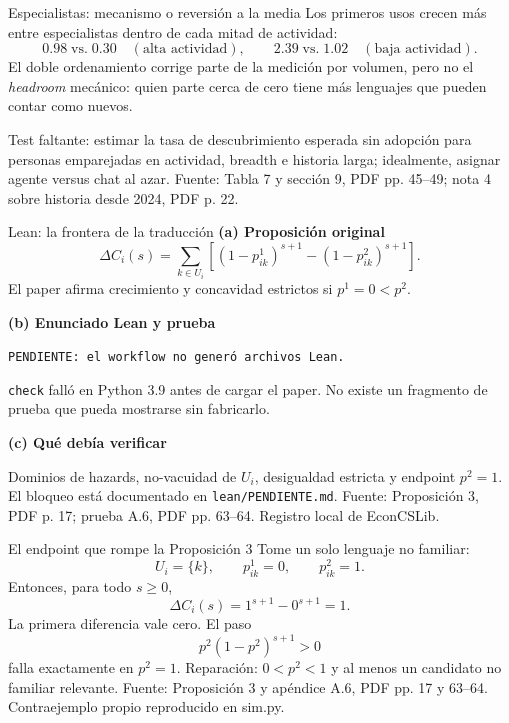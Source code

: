 \documentclass[aspectratio=169,11pt]{beamer}
\newcommand{\source}[1]{\vfill{\color{Gray}\tiny Fuente: #1}}
\begin{document}
\begin{frame}{Especialistas: mecanismo o reversión a la media}
  Los primeros usos crecen más entre especialistas dentro de cada mitad de actividad:
  \[
  0.98\;\text{vs.}\;0.30\quad(\text{alta actividad}),\qquad
  2.39\;\text{vs.}\;1.02\quad(\text{baja actividad}).
  \]
  El doble ordenamiento corrige parte de la medición por volumen, pero no el \emph{headroom} mecánico: quien parte cerca de cero tiene más lenguajes que pueden contar como nuevos.

  \vspace{0.35cm}
  Test faltante: estimar la tasa de descubrimiento esperada sin adopción para personas emparejadas en actividad, breadth e historia larga; idealmente, asignar agente versus chat al azar.
  \source{Tabla 7 y sección 9, PDF pp. 45--49; nota 4 sobre historia desde 2024, PDF p. 22.}
\end{frame}

\begin{frame}{Lean: la frontera de la traducción}
  \textbf{(a) Proposición original}
  \[
  \Delta C_i(s)=\sum_{k\in U_i}\left[(1-p^1_{ik})^{s+1}-(1-p^2_{ik})^{s+1}\right].
  \]
  El paper afirma crecimiento y concavidad estrictos si \(p^1=0<p^2\).

  \textbf{(b) Enunciado Lean y prueba}

  \texttt{PENDIENTE: el workflow no generó archivos Lean.}

  \texttt{check} falló en Python 3.9 antes de cargar el paper. No existe un fragmento de prueba que pueda mostrarse sin fabricarlo.

  \textbf{(c) Qué debía verificar}

  Dominios de hazards, no-vacuidad de \(U_i\), desigualdad estricta y endpoint \(p^2=1\). El bloqueo está documentado en \texttt{lean/PENDIENTE.md}.
  \source{Proposición 3, PDF p. 17; prueba A.6, PDF pp. 63--64. Registro local de EconCSLib.}
\end{frame}

\begin{frame}{El endpoint que rompe la Proposición 3}
  Tome un solo lenguaje no familiar:
  \[
  U_i=\{k\},\qquad p^1_{ik}=0,\qquad p^2_{ik}=1.
  \]
  Entonces, para todo \(s\ge0\),
  \[
  \Delta C_i(s)=1^{s+1}-0^{s+1}=1.
  \]
  La primera diferencia vale cero. El paso
  \[
  p^2(1-p^2)^{s+1}>0
  \]
  falla exactamente en \(p^2=1\). Reparación: \(0<p^2<1\) y al menos un candidato no familiar relevante.
  \source{Proposición 3 y apéndice A.6, PDF pp. 17 y 63--64. Contraejemplo propio reproducido en sim.py.}
\end{frame}
\end{document}
